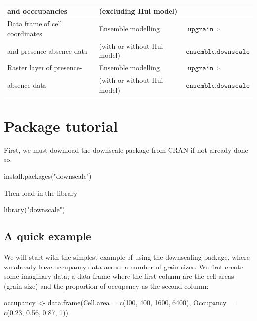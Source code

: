 \documentclass{article}[12pt, a4paper]
\begin{document}
\begin{table}[th]
\begin{tabular}{| l | l | l |}
and occcupancies                &	(excluding Hui model)& \\ \hline	
Data frame of cell coordinates  & Ensemble modelling   & $\texttt{upgrain} \Rightarrow$ \\
and presence-absence data       &	(with or without Hui model)& $\texttt{ensemble.downscale}$ \\ \hline
Raster layer of presence-       & Ensemble modelling   & $\texttt{upgrain} \Rightarrow$ \\
absence data                    &	(with or without Hui model)& $\texttt{ensemble.downscale}$ \\ \hline
\end{tabular}
\end{table}

\newpage
\section{Package tutorial}

First, we must download the downscale package from CRAN if not already done so.

\begin{Schunk}
\begin{Sinput}
install.packages("downscale")
\end{Sinput}
\end{Schunk}

Then load in the library

\begin{Schunk}
\begin{Sinput}
library("downscale")
\end{Sinput}
\end{Schunk}

\subsection{A quick example}
We will start with the simplest example of using the downscaling package, where we already have occupancy data across a number of grain sizes. We first create some imaginary data; a data frame where the first column are the cell areas (grain size) and the proportion of occupancy as the second column:

\begin{Schunk}
\begin{Sinput}
occupancy <- data.frame(Cell.area = c(100, 400, 1600, 6400),
                        Occupancy = c(0.23, 0.56, 0.87, 1))
\end{Sinput}
\end{Schunk}
\end{document}
